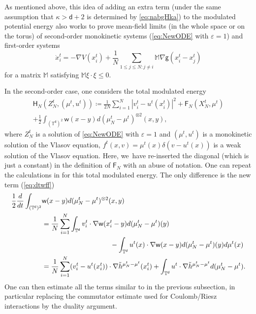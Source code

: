 \documentclass[10pt]{amsart}
\theoremstyle{plain}
\theoremstyle{definition}
\newcommand{\M}{{\mathbb{M}}}
\newcommand{\T}{{\mathbb{T}}}
\let\vep\varepsilon
\let\ka\kappa
\let\nab\nabla
\let\tl\tilde
\let\ux X
\newcommand{\Fr}{\mathsf{F}}
\renewcommand{\d}{\mathsf{d}}
\newcommand{\g}{{\mathsf{g}}}
\newcommand{\w}{\mathsf{w}}
\begin{document}
As mentioned above, this idea of adding an extra term (under the same assumption that $\ka>\d+2$ is determined by \eqref{eq:nabgHka}) to the modulated potential energy also works to prove mean-field limits (in the whole space or on the torus) of second-order monokinetic systems (\ie \eqref{eq:NewODE} with $\vep=1$) and first-order systems
\begin{equation}\label{eq:ODEfo}
\dot{x}_i^t = -\nab V(x_i^t) + \frac1N\sum_{1\le j\le N: j\ne i}\M\nab\g(x_i^t-x_j^t)
\end{equation}
for a matrix $\M$ satisfying $\M\xi\cdot\xi\le 0$.

In the second-order case, one considers the total modulated energy
\begin{multline*}
\mathsf{H}_N(Z_N^t,(\mu^t,u^t)) \coloneqq \frac{1}{2N}\sum_{i=1}^N |v_i^t-u^t(x_i^t)|^2 + \Fr_N(\ux_N^t,\mu^t) \\
+\frac{1}{2}\int_{(\T^\d)^2}\w(x-y)d(\mu_N^t-\mu^t)^{\otimes 2}(x,y),
\end{multline*}
where $Z_N^t$ is a solution of \eqref{eq:NewODE} with $\vep=1$ and $(\mu^t,u^t)$ is a monokinetic solution of the Vlasov equation, \ie $f^t(x,v) = \mu^t(x)\delta(v-u^t(x))$ is a weak solution of the Vlasov equation. Here, we~have re-inserted the diagonal (which is just a constant) in the definition of $\Fr_N$ with an abuse of notation. One can repeat the calculations in \cite[App.]{Serfaty2020} for this total modulated energy. The only difference is the new term (\cf \eqref{eq:dtwff})
\begin{align*}
\frac12\frac{d}{dt}\int_{(\T^\d)^2}&\w(x-y)d(\mu_N^t - \mu^t)^{\otimes 2}(x,y)\\
&= \frac1N\sum_{i=1}^N\int_{\T^\d}v_i^t\cdot\nab\w(x_i^t-y)d(\mu_N^t-\mu^t)(y)\\
&\hspace*{3.5cm} - \int_{\T^\d}u^t(x)\cdot\nab\w(x-y)d(\mu_N^t-\mu^t)(y)d\mu^t(x)\\
&= \frac1N\sum_{i=1}^N(v_i^t-u^t(x_i^t)) \cdot \nab\tl{h}^{\mu_N^t-\mu^t}(x_i^t) + \int_{\T^\d}u^t\cdot\nab\tl{h}^{\mu_N^t-\mu^t} d(\mu_N^t-\mu^t).
\end{align*}
One can then estimate all the terms similar to in the previous subsection, in particular replacing the commutator estimate used for Coulomb/Riesz interactions by the duality argument.
\end{document}
